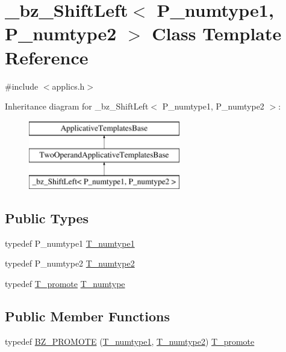 \hypertarget{class__bz__ShiftLeft}{}\section{\+\_\+bz\+\_\+\+Shift\+Left$<$ P\+\_\+numtype1, P\+\_\+numtype2 $>$ Class Template Reference}
\label{class__bz__ShiftLeft}


{\ttfamily \#include $<$applics.\+h$>$}

Inheritance diagram for \+\_\+bz\+\_\+\+Shift\+Left$<$ P\+\_\+numtype1, P\+\_\+numtype2 $>$\+:\begin{figure}[H]
\begin{center}
\leavevmode
\includegraphics[height=3.000000cm]{class__bz__ShiftLeft}
\end{center}
\end{figure}
\subsection*{Public Types}
\begin{DoxyCompactItemize}
\item 
typedef P\+\_\+numtype1 \hyperlink{class__bz__ShiftLeft_a80f900fe7ba18cce4a1b9c31fcf811a5}{T\+\_\+numtype1}
\item 
typedef P\+\_\+numtype2 \hyperlink{class__bz__ShiftLeft_a1bd6fec9610d921416764618bf2333b0}{T\+\_\+numtype2}
\item 
typedef \hyperlink{minmax_8h_aaa88a440c2f0d00798d5b1d42c79308d}{T\+\_\+promote} \hyperlink{class__bz__ShiftLeft_aa5c1d4f725128c97a4fbc3f8186581c3}{T\+\_\+numtype}
\end{DoxyCompactItemize}
\subsection*{Public Member Functions}
\begin{DoxyCompactItemize}
\item 
typedef \hyperlink{class__bz__ShiftLeft_a056fe8f694751269b78b429c8f416bcf}{B\+Z\+\_\+\+P\+R\+O\+M\+O\+T\+E} (\hyperlink{class__bz__ShiftLeft_a80f900fe7ba18cce4a1b9c31fcf811a5}{T\+\_\+numtype1}, \hyperlink{class__bz__ShiftLeft_a1bd6fec9610d921416764618bf2333b0}{T\+\_\+numtype2}) \hyperlink{minmax_8h_aaa88a440c2f0d00798d5b1d42c79308d}{T\+\_\+promote}
\end{DoxyCompactItemize}
